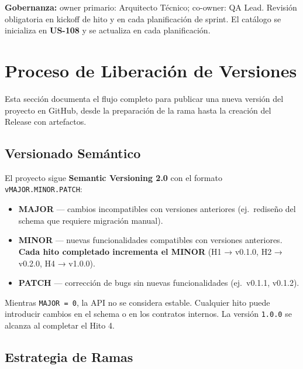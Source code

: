 \documentclass[11pt,a4paper]{article}
\newcommand{\fpath}[1]{\texttt{\small #1}}
\begin{document}
\textbf{Gobernanza:} owner primario: Arquitecto Técnico; co-owner: QA Lead. Revisión obligatoria en kickoff de hito y en cada planificación de sprint. El catálogo se inicializa en \textbf{US-108} y se actualiza en cada planificación.

\section{Proceso de Liberación de Versiones}
\label{sec:release}

Esta sección documenta el flujo completo para publicar una nueva versión del proyecto en GitHub, desde la preparación de la rama hasta la creación del Release con artefactos.

\subsection{Versionado Semántico}

El proyecto sigue \textbf{Semantic Versioning 2.0} con el formato \fpath{vMAJOR.MINOR.PATCH}:

\begin{itemize}[nosep]
  \item \textbf{MAJOR} — cambios incompatibles con versiones anteriores (ej.\ rediseño del schema que requiere migración manual).
  \item \textbf{MINOR} — nuevas funcionalidades compatibles con versiones anteriores. \textbf{Cada hito completado incrementa el MINOR} (H1 → v0.1.0, H2 → v0.2.0, H4 → v1.0.0).
  \item \textbf{PATCH} — corrección de bugs sin nuevas funcionalidades (ej.\ v0.1.1, v0.1.2).
\end{itemize}

\begin{notebox}
Mientras \fpath{MAJOR = 0}, la API no se considera estable. Cualquier hito puede introducir cambios en el schema o en los contratos internos. La versión \fpath{1.0.0} se alcanza al completar el Hito 4.
\end{notebox}

\subsection{Estrategia de Ramas}
\end{document}
